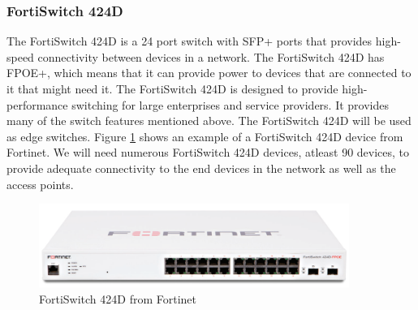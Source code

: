 \documentclass[12pt]{report}
\begin{document}
\subsubsection{FortiSwitch 424D}
The FortiSwitch 424D is a 24 port switch with SFP+ ports that provides high-speed connectivity between devices in a network. The FortiSwitch 424D has FPOE+, which means that it can provide power to devices that are connected to it that might need it. The FortiSwitch 424D is designed to provide high-performance switching for large enterprises and service providers. It provides many of the switch features mentioned above. The FortiSwitch 424D will be used as edge switches. Figure \ref{fig:424D} shows an example of a FortiSwitch 424D device from Fortinet. We will need numerous FortiSwitch 424D devices, atleast 90 devices, to provide adequate connectivity to the end devices in the network as well as the access points.\cite{424D}
\begin{figure}[h]
    \centering
    \includegraphics[width=0.9\textwidth]{images/424D.png}
    \caption{FortiSwitch 424D from Fortinet \cite{424D}}
    \label{fig:424D}
\end{figure}
\end{document}
